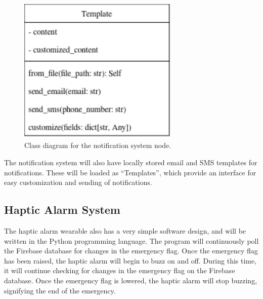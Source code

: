\begin{figure}[H]
    \centering
    \includegraphics[width=3in]{../assets/NotificationSystemClassDiagram.png}
    \caption{Class diagram for the notification system node.}
\end{figure}

The notification system will also have locally stored email and SMS templates for notifications. These will be loaded
as “Templates”, which provide an interface for easy customization and sending of notifications.

\subsection{Haptic Alarm System}

The haptic alarm wearable also has a very simple software design, and will be written in the Python programming
language. The program will continuously poll the Firebase database for changes in the emergency flag. Once the
emergency flag has been raised, the haptic alarm will begin to buzz on and off. During this time, it will continue
checking for changes in the emergency flag on the Firebase database. Once the emergency flag is lowered, the haptic
alarm will stop buzzing, signifying the end of the emergency.

